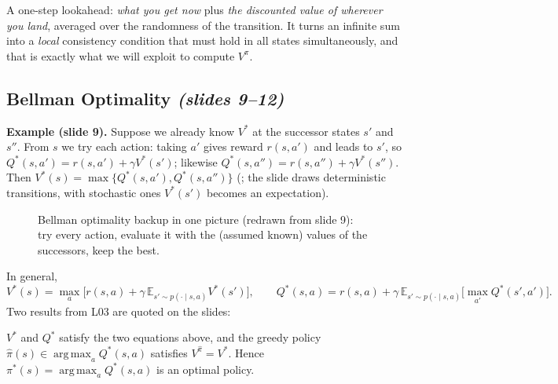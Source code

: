 \documentclass[11pt,a4paper]{article}
\newcommand{\E}{\mathbb{E}}
\DeclareMathOperator*{\argmax}{arg\,max}
\newcommand{\slides}[1]{\emph{(slides #1)}}
\theoremstyle{plain}
\theoremstyle{definition}
\theoremstyle{remark}
\begin{document}
\begin{intuition}
A one-step lookahead: \emph{what you get now} plus \emph{the discounted value of wherever you land}, averaged over the randomness of the transition. It turns an infinite sum into a \emph{local} consistency condition that must hold in all states simultaneously, and that is exactly what we will exploit to compute $V^\pi$.
\end{intuition}

\subsection{Bellman Optimality \slides{9--12}}
\textbf{Example (slide 9).} Suppose we already know $V^*$ at the successor states $s'$ and $s''$. From $s$ we try each action: taking $a'$ gives reward $r(s,a')$ and leads to $s'$, so $Q^*(s,a')=r(s,a')+\gamma V^*(s')$; likewise $Q^*(s,a'')=r(s,a'')+\gamma V^*(s'')$. Then $V^*(s)=\max\{Q^*(s,a'),Q^*(s,a'')\}$ (; the slide draws deterministic transitions, with stochastic ones $V^*(s')$ becomes an expectation).

\begin{figure}[htbp]
\centering
{}
\caption{Bellman optimality backup in one picture (redrawn from slide 9): try every action, evaluate it with the (assumed known) values of the successors, keep the best.}
\label{fig:tree}
\end{figure}

In general,
\[
V^*(s)=\max_a\Big[r(s,a)+\gamma\,\E_{s'\sim p(\cdot\mid s,a)}V^*(s')\Big],\qquad
Q^*(s,a)=r(s,a)+\gamma\,\E_{s'\sim p(\cdot\mid s,a)}\Big[\max_{a'}Q^*(s',a')\Big].
\]
Two results from L03 are quoted on the slides:

\begin{fact}\label{fact:bopt}
$V^*$ and $Q^*$ satisfy the two equations above, and the greedy policy $\hat\pi(s)\in\argmax_aQ^*(s,a)$ satisfies $V^{\hat\pi}=V^*$. Hence $\pi^*(s)=\argmax_aQ^*(s,a)$ is an optimal policy.
\end{fact}
\end{document}
